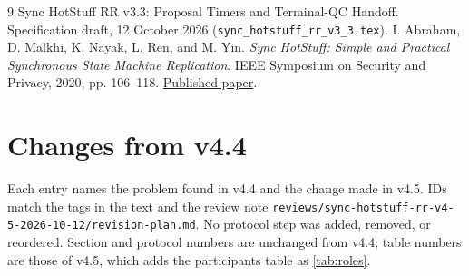 \documentclass[11pt,a4paper]{article}
\newcounter{protocol}
\begin{document}
\begingroup\small
\begin{thebibliography}{9}
Sync HotStuff RR v3.3: Proposal Timers and Terminal-QC Handoff.
Specification draft, 12 October 2026
(\texttt{sync\_hotstuff\_rr\_v3\_3.tex}).
I. Abraham, D. Malkhi, K. Nayak, L. Ren, and M. Yin.
\emph{Sync HotStuff: Simple and Practical Synchronous State Machine Replication}.
IEEE Symposium on Security and Privacy, 2020, pp. 106--118.
\href{https://conferences.computer.org/sp/pdfs/sp/2020/349700a106.pdf}{Published paper}.
\end{thebibliography}
\endgroup

\appendix
\section{Changes from v4.4}
\label{app:changes}
Each entry names the problem found in v4.4 and the change made in v4.5.
IDs match the tags in the text and the review note
\texttt{reviews/sync-hotstuff-rr-v4-5-2026-10-12/revision-plan.md}.
No protocol step was added, removed, or reordered. Section and protocol
numbers are unchanged from v4.4; table numbers are those of v4.5, which
adds the participants table as \cref{tab:roles}.
\end{document}
